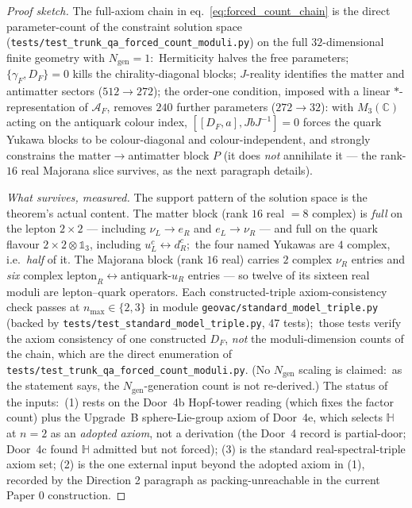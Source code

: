 \documentclass[11pt]{article}
\begin{document}
\begin{proof}[Proof sketch]
The full-axiom chain in eq.~\eqref{eq:forced_count_chain} is the
direct parameter-count of the constraint solution space
(\texttt{tests/test\_trunk\_qa\_forced\_count\_moduli.py}) on the full
$32$-dimensional finite geometry with
$N_{\mathrm{gen}} = 1$:\ Hermiticity halves the free parameters;
$\{\gamma_F, D_F\} = 0$ kills the chirality-diagonal blocks;
$J$-reality identifies the matter and antimatter sectors
($512 \to 272$); the order-one condition, imposed with a linear
$*$-representation of $\mathcal{A}_F$, removes $240$ further
parameters ($272 \to 32$): with $M_3(\mathbb{C})$ acting on the
antiquark colour index, $[[D_F, a], J b J^{-1}] = 0$ forces the quark
Yukawa blocks to be colour-diagonal and colour-independent, and strongly
constrains the matter$\to$antimatter block $P$ (it does \emph{not} annihilate
it --- the rank-$16$ real Majorana slice survives, as the next paragraph details).

\emph{What survives, measured.}  The support pattern of the solution
space is the theorem's actual content.  The matter block (rank $16$ real $=8$ complex) is
\emph{full} on the lepton $2\times2$ --- including $\nu_L \to e_R$ and
$e_L \to \nu_R$ --- and full on the quark flavour $2\times2 \otimes \mathbb{1}_3$,
including $u_L^c \leftrightarrow d_R^c$;\ the four named Yukawas are $4$
complex, i.e.\ \emph{half} of it.  The Majorana block (rank $16$ real) carries
$2$ complex $\nu_R$ entries and \emph{six} complex
$\text{lepton}_R \leftrightarrow \text{antiquark-}u_R$ entries --- so twelve of
its sixteen real moduli are lepton--quark operators.  Each constructed-triple
axiom-consistency check passes at
$n_{\max} \in \{2, 3\}$ in module
\texttt{geovac/standard\_model\_triple.py} (backed by
\texttt{tests/test\_standard\_model\_triple.py}, 47 tests);\ those
tests verify the axiom consistency of one constructed $D_F$, \emph{not}
the moduli-dimension counts of the chain, which are the direct
enumeration of \texttt{tests/test\_trunk\_qa\_forced\_count\_moduli.py}.  (No
$N_{\mathrm{gen}}$ scaling is claimed:\ as the statement says, the
$N_{\mathrm{gen}}$-generation count is not re-derived.)
The status of the inputs:\ (1) rests on the Door~4b Hopf-tower reading
(which fixes the factor count) plus the Upgrade~B sphere-Lie-group
axiom of Door~4e, which selects $\mathbb{H}$ at $n = 2$ as an
\emph{adopted axiom}, not a derivation (the Door~4 record is
partial-door; Door~4c found $\mathbb{H}$ admitted but not forced); (3)
is the standard real-spectral-triple axiom set; (2) is the one external
input beyond the adopted axiom in (1), recorded by the Direction 2 paragraph as packing-unreachable in
the current Paper 0 construction.
\end{proof}
\end{document}
